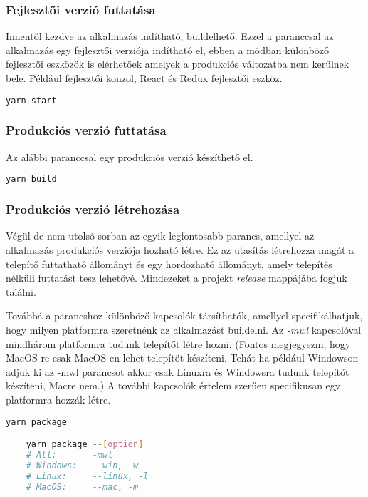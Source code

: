 \subsubsection{Fejlesztői verzió futtatása}
Innentől kezdve az alkalmazás indítható, buildelhető. Ezzel a paranccsal az alkalmazás egy fejlesztői verziója indítható el, ebben a módban különböző fejlesztői eszközök is elérhetőek amelyek a produkciós változatba nem kerülnek bele. Például fejlesztői konzol, React és Redux fejlesztői eszköz.
\begin{lstlisting}[language={Bash}, numbers={none}]
    yarn start
\end{lstlisting}

\subsubsection{Produkciós verzió futtatása}
Az alábbi paranccsal egy produkciós verzió készíthető el.
\begin{lstlisting}[language={Bash}, numbers={none}]
    yarn build
\end{lstlisting}

\subsubsection{Produkciós verzió létrehozása}
Végül de nem utolsó sorban az egyik legfontosabb parancs, amellyel az alkalmazás produkciós verziója hozható létre. Ez az utasítás létrehozza magát a telepítő futtatható állományt és egy hordozható állományt, amely telepítés nélküli futtatást tesz lehetővé. Mindezeket a projekt {\it release} mappájába fogjuk találni.

Továbbá a parancshoz különböző kapcsolók társíthatók, amellyel specifikálhatjuk, hogy milyen platformra szeretnénk az alkalmazást buildelni. Az {\it -mwl} kapcsolóval mindhárom platformra tudunk telepítőt létre hozni. (Fontos megjegyezni, hogy MacOS-re csak MacOS-en lehet telepítőt készíteni. Tehát ha például Windowson adjuk ki az -mwl parancsot akkor csak Linuxra és Windowsra tudunk telepítőt készíteni, Macre nem.) A további kapcsolók értelem szerűen specifikusan egy platformra hozzák létre.
\begin{lstlisting}[language={Bash}, numbers={none}]
    yarn package

    yarn package --[option]
    # All:       -mwl
    # Windows:   --win, -w
    # Linux:     --linux, -l
    # MacOS:     --mac, -m
\end{lstlisting}

